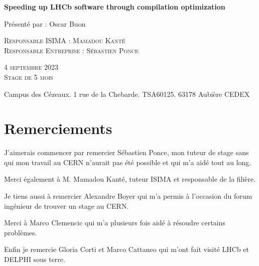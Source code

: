 \documentclass[a4paper]{report}
\begin{document}
\begin{titlepage}
    \vfill

    {\huge\bfseries Speeding up LHCb software through compilation optimization \par}

    \vfill

    {\Large Présenté par : Oscar Buon \par}

    \vfill

    \begin{minipage}{0.65\textwidth}
        \textsc{Responsable ISIMA : Mamadou Kanté}\\
        \textsc{Responsable Entreprise : Sébastien Ponce}\\
    \end{minipage}
    \hfill
    \begin{minipage}{0.25\textwidth}
        \textsc{4 septembre 2023} \\
        \textsc{Stage de 5 mois} \\
    \end{minipage}

    \vfill

    Campus des Cézeaux. 1 rue de la Chebarde. TSA60125. 63178 Aubière CEDEX
\end{titlepage}


\chapter*{Remerciements}
J'aimerais commencer par remercier Sébastien Ponce, mon tuteur de stage sans qui mon travail au CERN n'aurait pas été possible et qui m'a aidé tout au long.

Merci également à M. Mamadou Kanté, tuteur ISIMA et responsable de la filière.

\bigskip
Je tiens aussi à remercier Alexandre Boyer qui m'a permis à l'occasion du forum ingénieur de trouver un stage au CERN.

\bigskip
Merci à Marco Clemencic qui m'a plusieurs fois aidé à résoudre certains problèmes.

\bigskip
Enfin je remercie Gloria Corti et Marco Cattaneo qui m'ont fait visité LHCb et DELPHI sous terre.

\tableofcontents

\listoffigures
\end{document}
